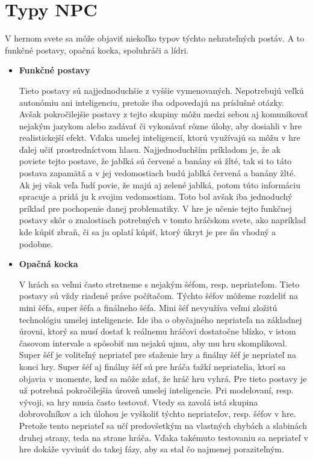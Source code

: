 \documentclass[10pt,twoside,slovak,a4paper]{article}
\begin{document}
\section{Typy NPC} 
V hernom svete sa môže objaviť niekoľko typov týchto nehrateľných postáv. A to funkčné postavy, opačná kocka, spoluhráči a lídri. 
\begin{itemize}
\item \textbf{Funkčné postavy}

 Tieto postavy sú najjednoduchšie z vyššie vymenovaných. Nepotrebujú veľkú autonómiu ani inteligenciu, pretože iba odpovedajú na príslušné otázky. Avšak pokročilejšie postavy z tejto skupiny môžu medzi sebou aj komunikovať nejakým jazykom alebo zadávať či vykonávať rôzne úlohy, aby dosiahli v hre realistickejší efekt. Vďaka umelej inteligencií, ktorú využívajú sa môžu v hre ďalej učiť prostredníctvom hlasu. Najjednoduchším príkladom je, že ak poviete tejto postave, že jablká sú červené a banány sú žlté, tak si to táto postava zapamätá a v jej vedomostiach budú jablká červená a banány žlté. Ak jej však veľa ľudí povie, že majú aj zelené jablká, potom túto informáciu spracuje a pridá ju k svojim vedomostiam. Toto bol avšak iba jednoduchý príklad pre pochopenie danej problematiky. V hre je učenie tejto funkčnej postavy skôr o znalostiach potrebných v tomto hráčskom svete, ako napríklad kde kúpiť zbraň, či sa ju oplatí kúpiť, ktorý úkryt je pre ňu vhodný a podobne.  \cite{Types}


\item \textbf{Opačná kocka}

 V hrách sa veľmi často stretneme s nejakým šéfom, resp. nepriateľom. Tieto postavy sú vždy riadené práve počítačom. Týchto šéfov môžeme rozdeliť na mini šéfa, super šéfa a finálneho šéfa. Mini šéf nevyužíva veľmi zložitú technológiu umelej inteligencie. Ide iba o obyčajného nepriateľa na základnej úrovni, ktorý sa musí dostať k reálnemu hráčovi dostatočne blízko, v istom časovom intervale a spôsobiť mu nejakú ujmu, aby mu hru skomplikoval. Super šéf je voliteľný nepriateľ pre sťaženie hry a finálny šéf je nepriateľ na konci hry. Super šéf aj finálny šéf sú pre hráča ťažkí nepriatelia, ktorí sa objavia v momente, keď sa môže zdať, že hráč hru vyhrá. Pre tieto postavy je už potrebná pokročilejšia úroveň umelej inteligencie. Pri modelovaní, resp. vývoji, sa hry musia často testovať. Vtedy sa zavolá istá skupina dobrovoľníkov a ich úlohou je vyškoliť týchto nepriateľov, resp. šéfov v hre. Pretože tento nepriateľ sa učí predovšetkým na vlastných chybách a slabinách druhej strany, teda na strane hráča. Vďaka takémuto testovaniu sa nepriateľ v hre dokáže vyvinúť do takej fázy, aby sa stal čo najmenej poraziteľným.  \cite{Types}


\end{itemize}
\end{document}
